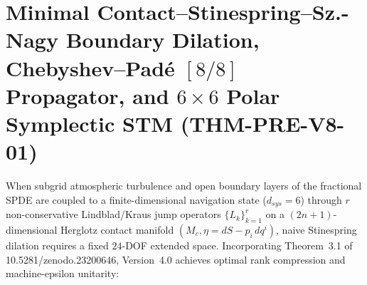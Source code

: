 \documentclass[11pt,a4paper,reqno]{article}
\def\texttt#1{#1}%
\def\mathrm#1{#1}%
\def\mathcal#1{#1}%
\def\zenodo#1{10.5281/zenodo.#1}%
\newcommand{\zenodo}[1]{\href{https://doi.org/10.5281/zenodo.#1}{\texttt{10.5281/\allowbreak zenodo.#1}}}
\theoremstyle{plain}
\theoremstyle{definition}
\theoremstyle{remark}
\numberwithin{equation}{section}
\begin{document}
\section{Minimal Contact--Stinespring--Sz.-Nagy Boundary Dilation, Chebyshev--Pad\'e \texorpdfstring{$[8/8]$}{[8/8]} Propagator, and \texorpdfstring{$6\times 6$}{6x6} Polar Symplectic STM (\texttt{THM-PRE-V8-01})}
\label{sec:minimal_stinespring_spde_v4}

When subgrid atmospheric turbulence and open boundary layers of the fractional SPDE are coupled to a finite-dimensional navigation state ($d_{\mathrm{sys}} = 6$) through $r$ non-conservative Lindblad/Kraus jump operators $\{L_k\}_{k=1}^r$ on a $(2n+1)$-dimensional Herglotz contact manifold $(\mathcal{M}_c, \eta = \mathrm{d}S - p_i\,\mathrm{d}q^i)$, naive Stinespring dilation requires a fixed $24$-DOF extended space. Incorporating Theorem~3.1 of \zenodo{23200646}, Version~4.0 achieves optimal rank compression and machine-epsilon unitarity:
\end{document}

